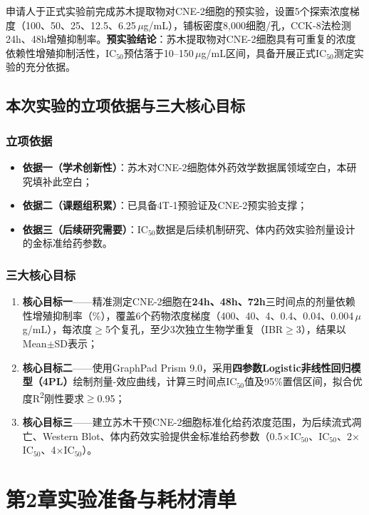 \documentclass[12pt,a4paper]{article}
\newcommand{\ic}{\ensuremath{\text{IC}_{50}}}
\newcommand{\um}{\,$\mu$g/mL}
\begin{document}
申请人于正式实验前完成苏木提取物对CNE-2细胞的预实验，设置5个探索浓度梯度（100、50、25、12.5、6.25\um{}），铺板密度8,000细胞/孔，CCK-8法检测24h、48h增殖抑制率。\textbf{预实验结论}：苏木提取物对CNE-2细胞具有可重复的浓度依赖性增殖抑制活性，\ic{}预估落于10--150\um{}区间，具备开展正式\ic{}测定实验的充分依据。

\subsection{本次实验的立项依据与三大核心目标}

\subsubsection{立项依据}

\begin{itemize}
\item \textbf{依据一（学术创新性）}：苏木对CNE-2细胞体外药效学数据属领域空白，本研究填补此空白；
\item \textbf{依据二（课题组积累）}：已具备4T-1预验证及CNE-2预实验支撑；
\item \textbf{依据三（后续研究需要）}：\ic{}数据是后续机制研究、体内药效实验剂量设计的金标准给药参数。
\end{itemize}

\subsubsection{三大核心目标}

\begin{enumerate}
\item \textbf{核心目标一}——精准测定CNE-2细胞在\textbf{24h、48h、72h}三时间点的剂量依赖性增殖抑制率（\%），覆盖6个药物浓度梯度（400、40、4、0.4、0.04、0.004\um{}），每浓度$\geq$5个复孔，至少3次独立生物学重复（IBR$\geq$3），结果以Mean$\pm$SD表示；
\item \textbf{核心目标二}——使用GraphPad Prism 9.0，采用\textbf{四参数Logistic非线性回归模型（4PL）}绘制剂量-效应曲线，计算三时间点\ic{}值及95\%置信区间，拟合优度R\textsuperscript{2}刚性要求$\geq$0.95；
\item \textbf{核心目标三}——建立苏木干预CNE-2细胞标准化给药浓度范围，为后续流式凋亡、Western Blot、体内药效实验提供金标准给药参数（0.5×\ic{}、\ic{}、2×\ic{}、4×\ic{}）。
\end{enumerate}

\section{第2章\enspace 实验准备与耗材清单}
\end{document}

